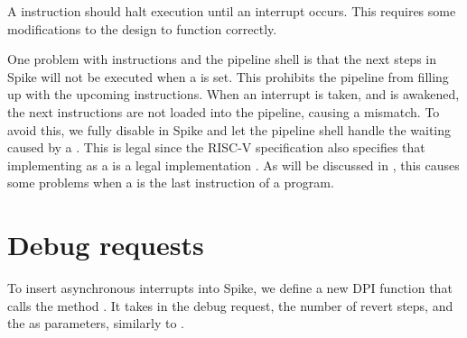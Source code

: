 
A  instruction should halt execution until an interrupt occurs. This requires some modifications to the design to function correctly.


One problem with  instructions and the pipeline shell is that the next steps in Spike will not be executed when a  is set. This prohibits the pipeline from filling up with the upcoming instructions. When an interrupt is taken, and  is awakened, the next instructions are not loaded into the pipeline, causing a mismatch. To avoid this, we fully disable  in Spike and let the pipeline shell handle the waiting caused by a . This is legal since the RISC-V specification also specifies that implementing  as a  is a legal implementation \cite{watermanRISCVInstructionSet2021}. As will be discussed in , this causes some problems when a  is the last instruction of a program.




\section{Debug requests}


To insert asynchronous interrupts into Spike, we define a new DPI function  that calls the method . It takes in the debug request, the number of revert steps, and the  as parameters, similarly to . 

